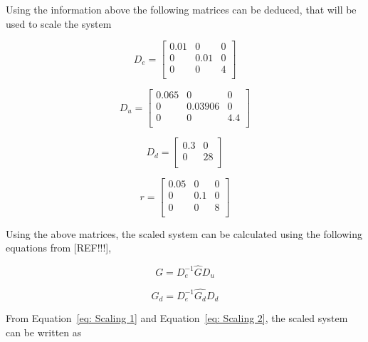 Using the information above the following matrices can be deduced, that will be used to scale the system

\begin{equation}
	D_e = \begin{bmatrix}
	0.01 & 0 & 0 \\
	0 & 0.01 & 0 \\
	0 & 0 & 4 \\
	\end{bmatrix}
\end{equation}

\begin{equation}
D_u = \begin{bmatrix}
0.065 & 0 & 0 \\
0 & 0.03906 & 0 \\
0 & 0 & 4.4 \\
\end{bmatrix}
\end{equation}

\begin{equation}
D_d = \begin{bmatrix}
0.3 & 0 \\
0 & 28 \\
\end{bmatrix}
\end{equation}

\begin{equation}
r = \begin{bmatrix}
0.05 & 0 & 0 \\
0 & 0.1 & 0 \\
0 & 0 & 8 \\
\end{bmatrix}
\end{equation}

Using the above matrices, the scaled system can be calculated using the following equations from [REF!!!],

\begin{equation}
	\label{eq: Scaling 1}
	G = D_e ^{-1}\hat{G}D_u
\end{equation}

\begin{equation}
	\label{eq: Scaling 2}
	G_d = D_e ^{-1}\hat{G_d}D_d
\end{equation}

From Equation~\ref{eq: Scaling 1} and Equation~\ref{eq: Scaling 2}, the scaled system can be written as 

